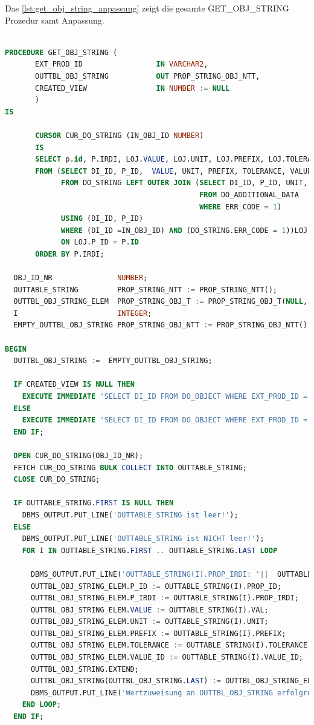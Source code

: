Das \autoref{lst:get_obj_string_anpassung} zeigt die gesamte GET\_OBJ\_STRING Prozedur samt Anpassung. 

 \begin{lstlisting}[caption=GET\_OBJ\_STRING Anpassung auf Property ID, language=sql, label=lst:get_obj_string_anpassung]

PROCEDURE GET_OBJ_STRING (
       EXT_PROD_ID                 IN VARCHAR2,
       OUTTBL_OBJ_STRING           OUT PROP_STRING_OBJ_NTT,
       CREATED_VIEW                IN NUMBER := NULL
       )
IS
       
       CURSOR CUR_DO_STRING (IN_OBJ_ID NUMBER) 
       IS
       SELECT p.id, P.IRDI, LOJ.VALUE, LOJ.UNIT, LOJ.PREFIX, LOJ.TOLERANCE, LOJ.VALUE_ID 
       FROM (SELECT DI_ID, P_ID,  VALUE, UNIT, PREFIX, TOLERANCE, VALUE_ID 
             FROM DO_STRING LEFT OUTER JOIN (SELECT DI_ID, P_ID, UNIT, PREFIX, TOLERANCE, VALUE_ID
                                             FROM DO_ADDITIONAL_DATA 
                                             WHERE ERR_CODE = 1)
             USING (DI_ID, P_ID) 
             WHERE (DI_ID =IN_OBJ_ID) AND (DO_STRING.ERR_CODE = 1))LOJ JOIN DE_PROPERTY P
             ON LOJ.P_ID = P.ID
       ORDER BY P.IRDI;      
 
  OBJ_ID_NR               NUMBER;
  OUTTABLE_STRING         PROP_STRING_NTT := PROP_STRING_NTT();
  OUTTBL_OBJ_STRING_ELEM  PROP_STRING_OBJ_T := PROP_STRING_OBJ_T(NULL, NULL, NULL, NULL, NULL, NULL, NULL);
  I                       INTEGER;
  EMPTY_OUTTBL_OBJ_STRING PROP_STRING_OBJ_NTT := PROP_STRING_OBJ_NTT();

BEGIN
  OUTTBL_OBJ_STRING :=  EMPTY_OUTTBL_OBJ_STRING;
   
  IF CREATED_VIEW IS NULL THEN
    EXECUTE IMMEDIATE 'SELECT DI_ID FROM DO_OBJECT WHERE EXT_PROD_ID = ''' || EXT_PROD_ID || ''' AND CREATED_VIEW IS NULL' INTO OBJ_ID_NR;
  ELSE
    EXECUTE IMMEDIATE 'SELECT DI_ID FROM DO_OBJECT WHERE EXT_PROD_ID = ''' || EXT_PROD_ID || ''' AND CREATED_VIEW = ' || CREATED_VIEW INTO OBJ_ID_NR ;
  END IF;
      
  OPEN CUR_DO_STRING(OBJ_ID_NR);
  FETCH CUR_DO_STRING BULK COLLECT INTO OUTTABLE_STRING; 
  CLOSE CUR_DO_STRING; 
  
  IF OUTTABLE_STRING.FIRST IS NULL THEN
    DBMS_OUTPUT.PUT_LINE('OUTTABLE_STRING ist leer!');
  ELSE 
    DBMS_OUTPUT.PUT_LINE('OUTTABLE_STRING ist NICHT leer!');
    FOR I IN OUTTABLE_STRING.FIRST .. OUTTABLE_STRING.LAST LOOP
      
      DBMS_OUTPUT.PUT_LINE('OUTTABLE_STRING(I).PROP_IRDI: '||  OUTTABLE_STRING(I).PROP_IRDI);
      OUTTBL_OBJ_STRING_ELEM.P_ID := OUTTABLE_STRING(I).PROP_ID;
      OUTTBL_OBJ_STRING_ELEM.P_IRDI := OUTTABLE_STRING(I).PROP_IRDI;
      OUTTBL_OBJ_STRING_ELEM.VALUE := OUTTABLE_STRING(I).VAL;
      OUTTBL_OBJ_STRING_ELEM.UNIT := OUTTABLE_STRING(I).UNIT;
      OUTTBL_OBJ_STRING_ELEM.PREFIX := OUTTABLE_STRING(I).PREFIX;
      OUTTBL_OBJ_STRING_ELEM.TOLERANCE := OUTTABLE_STRING(I).TOLERANCE;
      OUTTBL_OBJ_STRING_ELEM.VALUE_ID := OUTTABLE_STRING(I).VALUE_ID;
      OUTTBL_OBJ_STRING.EXTEND;
      OUTTBL_OBJ_STRING(OUTTBL_OBJ_STRING.LAST) := OUTTBL_OBJ_STRING_ELEM;
      DBMS_OUTPUT.PUT_LINE('Wertzuweisung an OUTTBL_OBJ_STRING erfolgreich!');
    END LOOP; 
  END IF;
   

\end{lstlisting}
